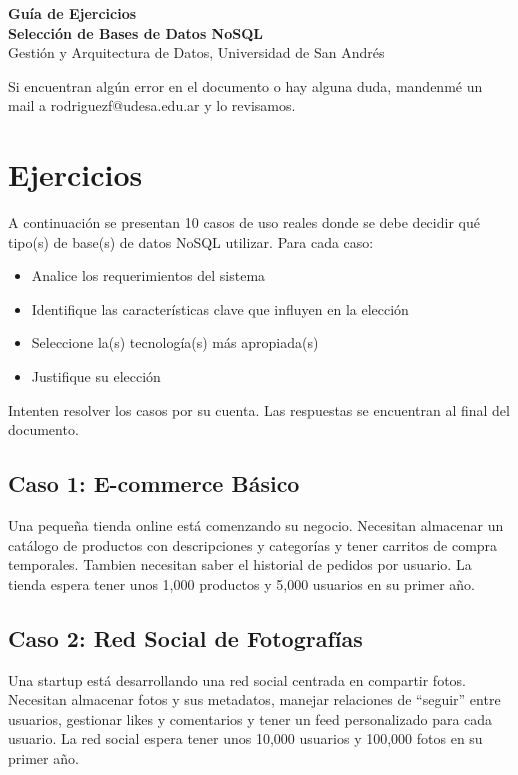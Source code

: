 \documentclass[12pt]{article}
\begin{document}
\begin{center}
  {\LARGE \textbf{Guía de Ejercicios \\ Selección de Bases de Datos NoSQL}}\\[0.5em]
  {Gestión y Arquitectura de Datos, Universidad de San Andrés}
\end{center}

Si encuentran algún error en el documento o hay alguna duda, mandenmé un mail a rodriguezf@udesa.edu.ar y lo revisamos.

\section{Ejercicios}

A continuación se presentan 10 casos de uso reales donde se debe decidir qué tipo(s) de base(s) de datos NoSQL utilizar. Para cada caso:
\begin{itemize}
    \item Analice los requerimientos del sistema
    \item Identifique las características clave que influyen en la elección
    \item Seleccione la(s) tecnología(s) más apropiada(s)
    \item Justifique su elección
\end{itemize}

Intenten resolver los casos por su cuenta. Las respuestas se encuentran al final del documento.

\subsection{Caso 1: E-commerce Básico}
Una pequeña tienda online está comenzando su negocio. Necesitan almacenar un catálogo de productos con descripciones y categorías y tener carritos de compra temporales. Tambien necesitan saber el historial de pedidos por usuario. La tienda espera tener unos 1,000 productos y 5,000 usuarios en su primer año.

\subsection{Caso 2: Red Social de Fotografías}
Una startup está desarrollando una red social centrada en compartir fotos. Necesitan almacenar fotos y sus metadatos, manejar relaciones de ``seguir'' entre usuarios, gestionar likes y comentarios y tener un feed personalizado para cada usuario. La red social espera tener unos 10,000 usuarios y 100,000 fotos en su primer año.
\end{document}
